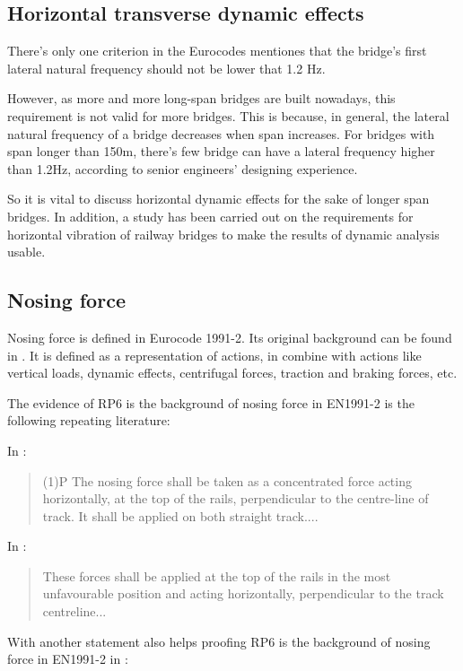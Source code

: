 \begin{appendices}
\section{Horizontal transverse dynamic effects}
There's only one criterion in the Eurocodes mentiones that the bridge's first lateral natural frequency should not be lower that 1.2 Hz. 

However, as more and more long-span bridges are built nowadays, this requirement is not valid for more bridges. This is because, in general, the lateral natural frequency of a bridge decreases when span increases. For bridges with span longer than 150m, there's few bridge can have a lateral frequency higher than 1.2Hz, according to senior engineers' designing experience.

So it is vital to discuss horizontal dynamic effects for the sake of longer span bridges. In addition, a study has been carried out on the requirements for horizontal vibration of railway bridges to make the results of dynamic analysis usable.



\subsection{Nosing force}\label{sec:nosingforce}
Nosing force is defined in Eurocode 1991-2. Its original background can be found in \citet[Proposed criteria]{d181}. It is defined as a representation of actions, in combine with actions like vertical loads, dynamic effects, centrifugal forces, traction and braking forces, etc.

The evidence of RP6 is the background of nosing force in EN1991-2 is the following repeating literature:

In \citet[6.5.2]{EC12}:
\begin{quote}
	(1)P The nosing force shall be taken as a concentrated force acting horizontally, at the top of the rails, perpendicular to the centre-line of track. It shall be applied on both straight track....
\end{quote}

In \citet[4.1B]{d181}:
\begin{quote}
	These forces shall be applied at the top of the rails in the most unfavourable position and acting horizontally, perpendicular to the track centreline...
\end{quote}

With another statement also helps proofing RP6 is the background of nosing force in EN1991-2 in \citet[4:Draft Recommendations]{d181}:


\end{appendices}
